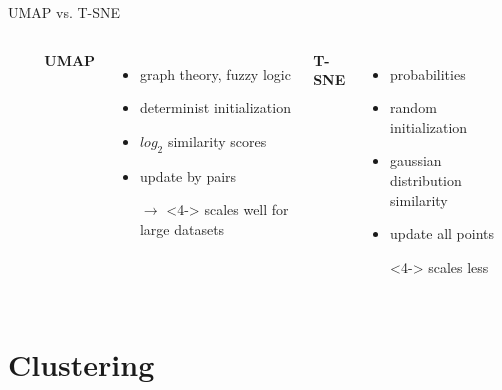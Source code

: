 \documentclass{irdbeamer}
\begin{document}
\begin{frame}{UMAP vs. T-SNE}
\begin{columns}
\begin{column}{0.05\textwidth}
\begin{itemize}
    \item[] 
    \item[] 
    \item[] 
    \item[] 
    \item[] 
\end{itemize}
\end{column}
        \textbf{UMAP}
        \begin{itemize}
            \item<1-> graph theory, fuzzy logic
            \item<2-> determinist initialization
            \item<3-> $log_2$ similarity scores
            \item<4-> update by pairs 
            \item[$\rightarrow$]<4-> scales well for large datasets
        \end{itemize}
        \textbf{T-SNE}
        \begin{itemize}
            \item<1-> probabilities
            \item<2-> random initialization
            \item<3-> gaussian distribution similarity
            \item<4-> update all points
            \item[]<4-> scales less
        \end{itemize}
\end{columns}
\end{frame}


\section{Clustering}
\end{document}
